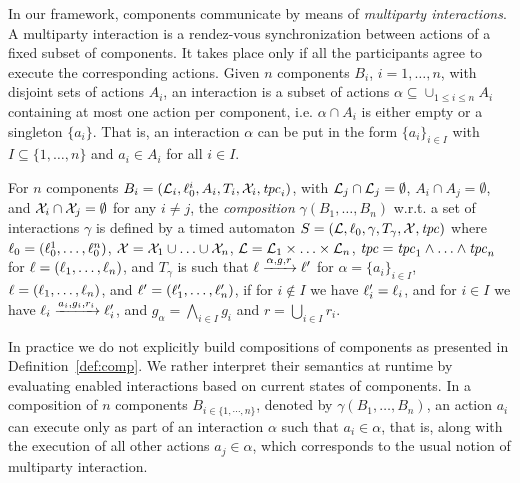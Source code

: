   In our framework, components communicate by means of
  \emph{multiparty interactions}.
  A multiparty interaction is a rendez-vous synchronization between actions of
  a fixed subset of components. It takes
  place only if all the participants agree to execute the corresponding actions.
  Given $n$ components $B_i$, $i=1,\dots,n$, with disjoint sets of actions
  $A_i$, an interaction is a subset of actions $\alpha \subseteq \cup_{1 \leq  i \leq n} A_i$
  containing at most one action per component, i.e. $\alpha \cap A_i$ is either empty or a singleton $\{ a_i \}$.
  That is, an interaction 
  $\alpha$ can be put in the form $\{ a_i \}_{i \in I}$ with $I \subseteq \{ 1, \ldots, n \}$ and $a_i \in A_i$ for all $i \in I$.
 
  
  

\begin{definition}[Composition] 
  \label{def:comp}
  For $n$ components $B_i = (\mathcal{L}_i,
  \ell^i_0, A_i, T_i, \mathcal{X}_i, \mathit{tpc}_i)$, with $\mathcal{L}_j \cap \mathcal{L}_j = \emptyset$, $A_i \cap A_j = 
  \emptyset$, and $\mathcal{X}_i \cap \mathcal{X}_j = \emptyset$ for any $i \neq j$, the
  \emph{composition} $\gamma(B_1, \ldots, B_n)$ w.r.t. a set of interactions
  $\gamma$ is defined by a timed automaton
  $S = (\mathcal{L},\ell_0,\gamma,T_{\gamma},\mathcal{X},\mathit{tpc})$ where $\ell_0 =
  (\ell^1_0,\dots, \ell^n_0)$, $\mathcal{X}=\mathcal{X}_1\cup\ldots\cup\mathcal{X}_n$, $\mathcal{L}=\mathcal{L}_1\times\ldots\times\mathcal{L}_n$,
  $\mathit{tpc}=\mathit{tpc}_1 \wedge \ldots \wedge \mathit{tpc}_n$ for $\ell=(\ell_1,\dots,
  \ell_n)$, and $T_{\gamma}$ is such that $\ell\xrightarrow{\alpha,g,r}{}\ell'$ for 
  $\alpha=\{a_i\}_{i\in I}$, $\ell=(\ell_1,\dots,\ell_n)$, and $\ell'=(\ell'_1,\dots
  ,\ell'_n)$, if for $i\not\in I$ we have $\ell'_i = \ell_i$, and for $i\in I$ we have 
  $\ell_i\xrightarrow{a_i,g_i,r_i}\ell'_i$, and $g_{\alpha}=\bigwedge_{i\in I}g_i$ and $r=\bigcup_{i\in I}r_i$.
\end{definition}

In practice we do not explicitly build compositions of components as presented in Definition~\ref{def:comp}.
We rather interpret their semantics at runtime by evaluating enabled interactions based on current states of components.
In a composition of $n$ components $B_{i\in\{1,\cdots,n\}}$, denoted by $\gamma(B_1, \ldots, B_n)$,
an action $a_i$ can execute only as part of an interaction $\alpha$ such that $a_i \in
\alpha$, that is, along with the execution of all other actions $a_j
\in \alpha$, which corresponds to the usual notion of multiparty
interaction.

